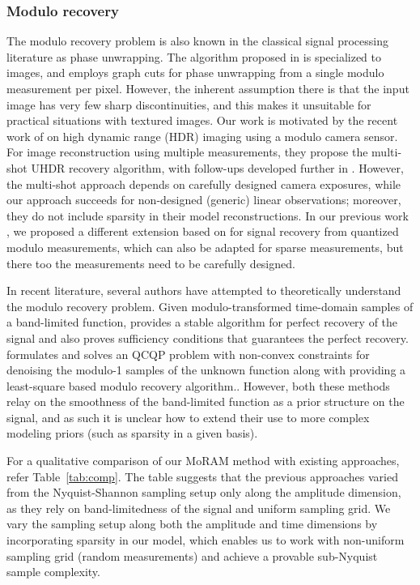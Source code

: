 \subsubsection*{Modulo recovery} The modulo recovery problem is also known in the classical signal processing literature
as phase unwrapping. The algorithm proposed in \cite{bioucas2007phase} is specialized to images, and employs graph cuts for phase unwrapping from a single modulo measurement per pixel. However, the inherent assumption there is that the input image has very few sharp discontinuities, and this makes it unsuitable for practical situations with textured images. Our work is motivated by the recent work of \cite{ICCP15_Zhao} on high dynamic range (HDR) imaging using a modulo camera sensor. For image reconstruction using multiple measurements, they propose the multi-shot UHDR recovery algorithm, with follow-ups developed further in \cite{Lang2017}. However, the multi-shot approach depends on carefully designed camera exposures, while our approach succeeds for non-designed (generic) linear observations; moreover, they do not include sparsity in their model reconstructions. In our previous work \cite{Shah}, we proposed a different extension based on \cite{ICCP15_Zhao, soltani2017stable} for signal recovery from quantized modulo measurements, which can also be adapted for sparse measurements, but there too the measurements need to be carefully designed.

In recent literature, several authors have attempted to theoretically understand the modulo recovery problem. Given modulo-transformed time-domain samples of a band-limited function, \cite{Bhandari} provides a stable algorithm for perfect recovery of the signal and also proves sufficiency conditions that guarantees the perfect recovery. \cite{Cucuringu2017} formulates and solves an QCQP problem with non-convex constraints for denoising the modulo-1 samples of the unknown function along with providing a least-square based modulo recovery algorithm.. However, both these methods relay on the smoothness of the band-limited function as a prior structure on the signal, and as such it is unclear how to extend their use to more complex modeling priors (such as sparsity in a given basis). 

For a qualitative comparison of our MoRAM method with existing approaches, refer Table~\ref{tab:comp}. The table suggests that the previous approaches varied from the Nyquist-Shannon sampling setup only along the amplitude dimension, as they rely on band-limitedness of the signal and uniform sampling grid. We vary the sampling setup along both the amplitude and time dimensions by incorporating sparsity in our model, which enables us to work with non-uniform sampling grid (random measurements) and achieve a provable sub-Nyquist sample complexity.

